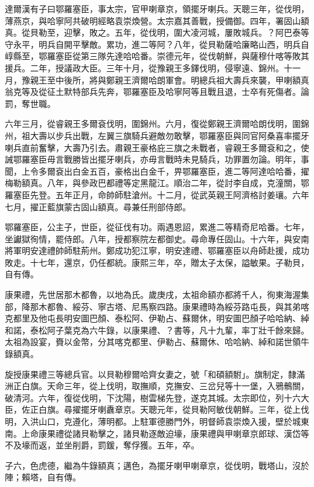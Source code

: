 \begin{pinyinscope}
達爾漢有子曰鄂羅塞臣，事太宗，官甲喇章京，領擺牙喇兵。天聰三年，從伐明，薄燕京，與哈寧阿共破明經略袁崇煥營。太宗嘉其善戰，授備御。四年，署固山額真。從貝勒至，迎擊，敗之。五年，從伐明，圍大凌河城，屢敗城兵。？阿巴泰等守永平，明兵自開平擊敵。累功，進二等阿？八年，從貝勒薩哈廉略山西，明兵自崞縣至，鄂羅塞臣從第三隊先達哈哈番。崇德元年，從伐朝鮮，與薩穆什喀等敗其援兵。二年，授議政大臣。三年十月，從豫親王多鐸伐明，侵寧遠、錦州。十一月，豫親王至中後所，將與鄭親王濟爾哈朗軍會。明總兵祖大壽兵來襲，甲喇額真翁克等及從征土默特部兵先奔，鄂羅塞臣及哈寧阿等且戰且退，士卒有死傷者。論罰，奪世職。

六年三月，從睿親王多爾袞伐明，圍錦州。六月，復從鄭親王濟爾哈朗伐明，圍錦州，祖大壽以步兵出戰，左翼三旗騎兵避敵勿敢擊，鄂羅塞臣與同官阿桑喜率擺牙喇兵直前奮擊，大壽乃引去。肅親王豪格庇三旗之未戰者，睿親王多爾袞和之，使誡鄂羅塞臣毋言戰勝皆出擺牙喇兵，亦毋言戰時未見騎兵，功罪置勿論。明年，事聞，上令多爾袞出白金五百，豪格出白金千，畀鄂羅塞臣，進二等阿達哈哈番，擢梅勒額真。八年，與參政巴都禮等定黑龍江。順治二年，從討李自成，克潼關，鄂羅塞臣先登。五年正月，命帥師駐滄州。十二月，從武英親王阿濟格討姜瓖。六年七月，擢正藍旗蒙古固山額真。尋兼任刑部侍郎。

鄂羅塞臣，公主子，世臣，從征伐有功。兩遇恩詔，累進二等精奇尼哈番。七年，坐讞獄徇情，罷侍郎。八年，授都察院左都御史。尋命專任固山。十六年，與安南將軍明安達禮帥師駐荊州。鄭成功犯江寧，明安達禮、鄂羅塞臣以舟師赴援，成功敗走。十七年，還京，仍任都統。康熙三年，卒，贈太子太保，謚敏果。子勒貝，自有傳。

康果禮，先世居那木都魯，以地為氏。歲庚戌，太祖命額亦都將千人，徇東海渥集部，降那木都魯、綏芬、寧古塔、尼馬察四路。康果禮時為綏芬路屯長，與其弟喀克都里及他屯長明安圖巴顏、泰松阿、伊勒占、蘇爾休，明安圖巴顏子哈哈納、綽和諾，泰松阿子葉克為六牛錄，以康果禮、？書等，凡十九輩，率丁壯千餘來歸。太祖為設宴，賚以金幣，分其喀克都里、伊勒占、蘇爾休、哈哈納、綽和諾世領牛錄額真。

旋授康果禮三等總兵官。以貝勒穆爾哈齊女妻之，號「和碩額駙」。旗制定，隸滿洲正白旗。天命三年，從上伐明，取撫順，克撫安、三岔兒等十一堡，入鴉鶻關，破清河。六年，復從伐明，下沈陽，樹雲梯先登，遂克其城。太宗即位，列十六大臣，佐正白旗。尋擢擺牙喇纛章京。天聰元年，從貝勒阿敏伐朝鮮。三年，從上伐明，入洪山口，克遵化，薄明都。上駐軍德勝門外，明督師袁崇煥入援，壁於城東南。上命康果禮從諸貝勒擊之，諸貝勒逐敵迫壕，康果禮與甲喇章京郎球、漢岱等不及壕而返，並坐削爵，罰鍰，奪俘獲。五年，卒。

子六，色虎德，繼為牛錄額真；邁色，為擺牙喇甲喇章京，從伐明，戰塔山，沒於陣；賴塔，自有傳。


\end{pinyinscope}
